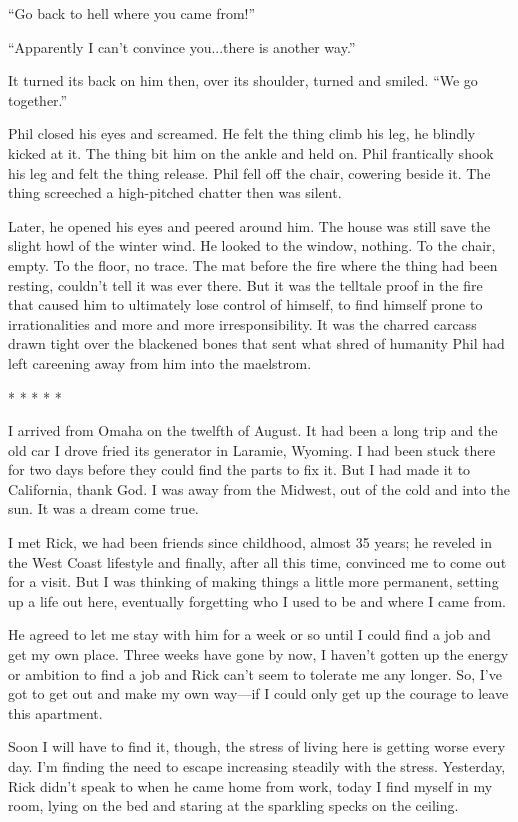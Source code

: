 ``Go back to hell where you came from!''

``Apparently I can't convince you...there is another way.''

It turned its back on him then, over its shoulder, turned and smiled.
``We go together.''

Phil closed his eyes and screamed. He felt the thing climb his leg, he
blindly kicked at it. The thing bit him on the ankle and held on. Phil
frantically shook his leg and felt the thing release. Phil fell off the
chair, cowering beside it. The thing screeched a high-pitched chatter
then was silent.

Later, he opened his eyes and peered around him. The house was still
save the slight howl of the winter wind. He looked to the window,
nothing. To the chair, empty. To the floor, no trace. The mat before the
fire where the thing had been resting, couldn't tell it was ever there.
But it was the telltale proof in the fire that caused him to ultimately
lose control of himself, to find himself prone to irrationalities and
more and more irresponsibility. It was the charred carcass drawn tight
over the blackened bones that sent what shred of humanity Phil had left
careening away from him into the maelstrom.

* * * * *

I arrived from Omaha on the twelfth of August. It had been a long trip
and the old car I drove fried its generator in Laramie, Wyoming. I had
been stuck there for two days before they could find the parts to fix
it. But I had made it to California, thank God. I was away from the
Midwest, out of the cold and into the sun. It was a dream come true.

I met Rick, we had been friends since childhood, almost 35 years; he
reveled in the West Coast lifestyle and finally, after all this time,
convinced me to come out for a visit. But I was thinking of making
things a little more permanent, setting up a life out here, eventually
forgetting who I used to be and where I came from.

He agreed to let me stay with him for a week or so until I could find a
job and get my own place. Three weeks have gone by now, I haven't gotten
up the energy or ambition to find a job and Rick can't seem to tolerate
me any longer. So, I've got to get out and make my own way---if I could
only get up the courage to leave this apartment.

Soon I will have to find it, though, the stress of living here is
getting worse every day. I'm finding the need to escape increasing
steadily with the stress. Yesterday, Rick didn't speak to when he came
home from work, today I find myself in my room, lying on the bed and
staring at the sparkling specks on the ceiling.

